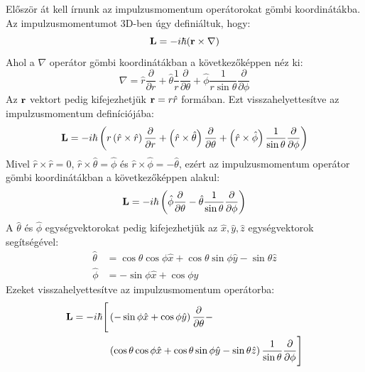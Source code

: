 \documentclass[../main.tex]{subfiles}
\begin{document}
Először át kell írnunk az impulzusmomentum operátorokat gömbi koordinátákba. Az impulzusmomentumot 3D-ben úgy definiáltuk, hogy:
\begin{equation}
    \bold{L} = - i \hbar (\bold{r} \times \nabla)
\end{equation}
Ahol a $\nabla$ operátor gömbi koordinátákban a következőképpen néz ki:
\begin{equation}
    \nabla = \hat{r} \frac{\partial}{\partial r} + \hat{\theta} \frac{1}{r} \frac{\partial}{\partial \theta} + \hat{\phi} \frac{1}{r \sin \theta} \frac{\partial}{\partial \phi}
\end{equation}
Az $\bold{r}$ vektort pedig kifejezhetjük $\bold{r} = r \hat{r}$ formában. Ezt visszahelyettesítve az impulzusmomentum definíciójába:
\begin{equation}
    \bold{L} = - i \hbar \left( r\left(\hat{r} \times \hat{r} \right)\frac{\partial}{\partial r} + \left(\hat{r} \times \hat{\theta} \right)\frac{\partial}{\partial \theta} + \left(\hat{r} \times \hat{\phi} \right)\frac{1}{\sin \theta}\frac{\partial}{\partial \phi} \right)
\end{equation}
Mivel $\hat{r} \times \hat{r} = 0$, $\hat{r} \times \hat{\theta} = \hat{\phi}$ és $\hat{r} \times \hat{\phi} = -\hat{\theta}$, ezért az impulzusmomentum operátor gömbi koordinátákban a következőképpen alakul:
\begin{equation}
    \bold{L} = - i \hbar \left( \hat{\phi} \frac{\partial}{\partial \theta} - \hat{\theta} \frac{1}{\sin \theta} \frac{\partial}{\partial \phi} \right)
\end{equation}
A $\hat{\theta}$ és $\hat{\phi}$ egységvektorokat pedig kifejezhetjük az $\hat{x}, \hat{y}, \hat{z}$ egységvektorok segítségével:
\begin{equation}
    \begin{aligned}
        \hat{\theta} &= \cos \theta \cos \phi \hat{x} + \cos \theta \sin \phi \hat{y} - \sin \theta \hat{z} \\
        \hat{\phi} &= - \sin \phi \hat{x} + \cos \phi \hat{y}
    \end{aligned}
\end{equation}
Ezeket visszahelyettesítve az impulzusmomentum operátorba:
\begin{equation}
    \begin{aligned}
        \bold{L} = - i \hbar \Bigg[ &\left(- \sin \phi \hat{x} + \cos \phi \hat{y}\right) \frac{\partial}{\partial \theta} - \\
        &\left(\cos \theta \cos \phi \hat{x} + \cos \theta \sin \phi \hat{y} - \sin \theta \hat{z}\right) \frac{1}{\sin \theta} \frac{\partial}{\partial \phi} \Bigg]
    \end{aligned}
\end{equation}
\end{document}
